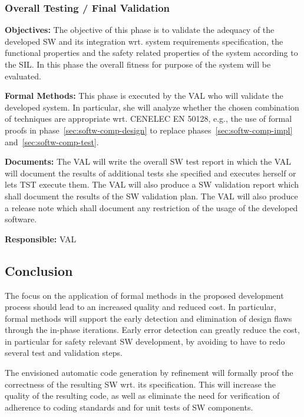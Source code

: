 \subsubsection{Overall Testing / Final Validation}
\label{sec:overall-testing-}

{\bf Objectives:} The objective of this phase is to validate the adequacy of the
developed SW and its integration wrt. system requirements specification, the
functional properties and the safety related properties of the system according
to the SIL. In this phase the overall fitness for purpose of the system will be
evaluated.

{\bf Formal Methods:} This phase is executed by the VAL who will validate the
developed system. In particular, she will analyze whether the chosen combination
of techniques are appropriate wrt. CENELEC EN 50128, e.g., the use of formal
proofs in phase~\ref{sec:softw-comp-design} to replace
phases~\ref{sec:softw-comp-impl} and~\ref{sec:softw-comp-test}.

{\bf Documents:} The VAL will write the overall SW test report in which the VAL
will document the results of additional tests she specified and executes herself
or lets TST execute them. The VAL will also produce a SW validation report which
shall document the results of the SW validation plan. The VAL will also produce
a release note which shall document any restriction of the usage of the
developed software.

{\bf Responsible:} VAL


\subsection{Conclusion}
\label{sec:conclusion-fm-process}

The focus on the application of formal methods in the proposed development
process should lead to an increased quality and reduced cost. In particular,
formal methods will support the early detection and elimination of design flaws
through the in-phase iterations. Early error detection can greatly reduce the
cost, in particular for safety relevant SW development, by avoiding to have to
redo several test and validation steps.

The envisioned automatic code generation by refinement will formally proof the
correctness of the resulting SW wrt. its specification. This will increase the
quality of the resulting code, as well as eliminate the need for verification of
adherence to coding standards and for unit tests of SW components.



